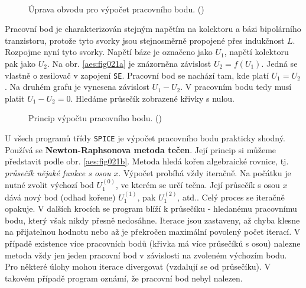       \begin{figure}[ht!]
        \centering  
                  \\
        \caption{Úprava obvodu pro výpočet pracovního bodu. (\cite[s.~59]{KolkaBiolek2011})}
        \label{aes:fig020}
      \end{figure}

      Pracovní bod je charakterizován stejným napětím na kolektoru a bázi bipolárního tranzistoru,
      protože tyto svorky jsou stejnosměrně propojené přes indukčnost \(L\). Rozpojme nyní tyto
      svorky. Napětí báze je označeno jako \(U_1\), napětí kolektoru pak jako \(U_2\). Na obr.
      \ref{aes:fig021a} je znázorněna závislost \(U_2=f(U_1)\). Jedná se vlastně o zesilovač v
      zapojení \texttt{SE}. Pracovní bod se nachází tam, kde platí \(U_1 = U_2\). Na druhém grafu je
      vynesena závislost \(U_1-U_2\). V pracovním bodu tedy musí platit \(U_1 - U_2 = 0\). Hledáme
      průsečík zobrazené křivky s nulou.

      \begin{figure}[ht!]
        \centering  
            \hspace{1em}
        \caption{Princip výpočtu pracovního bodu. (\cite[s.~60]{KolkaBiolek2011})}
        \label{aes:fig021}
      \end{figure}
      
      U všech programů třídy \texttt{SPICE} je výpočet pracovního bodu prakticky shodný. Používá se
      \textbf{Newton-Raphsonova metoda tečen}. Její princip si můžeme představit podle obr.
      \ref{aes:fig021b}. Metoda hledá kořen algebraické rovnice, tj. \emph{průsečík nějaké
      funkce s osou \(x\)}. Výpočet probíhá vždy iteračně. Na počátku je nutné zvolit výchozí bod
      \(U_1^{(0)}\), ve kterém se určí tečna. Její průsečík s osou \(x\) dává nový bod (odhad
      kořene) \(U_1^{(1)}\), pak \(U_1^{(2)}\), atd.. Celý proces se iteračně opakuje. V dalších
      krocích se program blíží k průsečíku - hledanému pracovnímu bodu, který však nikdy přesně
      nedosáhne. Iterace jsou zastaveny, až chyba klesne na přijatelnou hodnotu nebo až je překročen
      maximální povolený počet iterací. V případě existence více pracovních bodů (křivka má více
      průsečíků s osou) nalezne metoda vždy jen jeden pracovní bod v závislosti na zvoleném výchozím
      bodu. Pro některé úlohy mohou iterace divergovat (vzdalují se od průsečíku). V takovém případě
      program oznámí, že pracovní bod nebyl nalezen.

